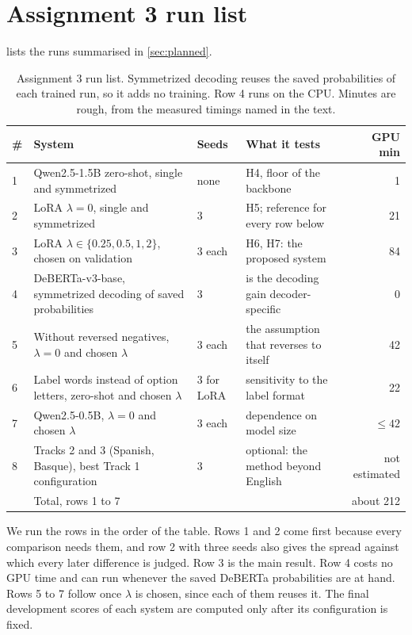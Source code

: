 \section{Assignment 3 run list}
\label{app:planned}

 lists the runs summarised in \cref{sec:planned}.

\begin{table}[H]
\centering
\small
\begin{tabular}{@{}N{0.05\textwidth}L{0.33\textwidth}N{0.10\textwidth}N{0.30\textwidth}r@{}}
\toprule
\# & System & Seeds & What it tests & GPU min \\
 & Qwen2.5-1.5B zero-shot, single and symmetrized & none & H4, floor of the backbone & 1 \\
2 & LoRA $\lambda = 0$, single and symmetrized & 3 & H5; reference for every row below & 21 \\
3 & LoRA $\lambda \in \{0.25, 0.5, 1, 2\}$, chosen on validation & 3 each & H6, H7: the proposed system & 84 \\
4 & DeBERTa-v3-base, symmetrized decoding of saved probabilities & 3 & is the decoding gain decoder-specific & 0 \\
5 & Without reversed negatives, $\lambda = 0$ and chosen $\lambda$ & 3 each & the assumption that \NO{} reverses to itself & 42 \\
6 & Label words instead of option letters, zero-shot and chosen $\lambda$ & 3 for LoRA & sensitivity to the label format & 22 \\
7 & Qwen2.5-0.5B, $\lambda = 0$ and chosen $\lambda$ & 3 each & dependence on model size & $\le 42$ \\
8 & Tracks 2 and 3 (Spanish, Basque), best Track 1 configuration & 3 & optional: the method beyond English & not estimated \\
\midrule
 & Total, rows 1 to 7 & & & about 212 \\
\bottomrule
\end{tabular}
\caption{Assignment 3 run list. Symmetrized decoding reuses the saved probabilities of each trained run, so it adds no training. Row 4 runs on the CPU. Minutes are rough, from the measured timings named in the text.}
\label{tab:planned}
\end{table}

We run the rows in the order of the table. Rows 1 and 2 come first because every comparison needs them, and row 2 with three seeds also gives the spread against which every later difference is judged. Row 3 is the main result. Row 4 costs no GPU time and can run whenever the saved DeBERTa probabilities are at hand. Rows 5 to 7 follow once $\lambda$ is chosen, since each of them reuses it. The final development scores of each system are computed only after its configuration is fixed.
